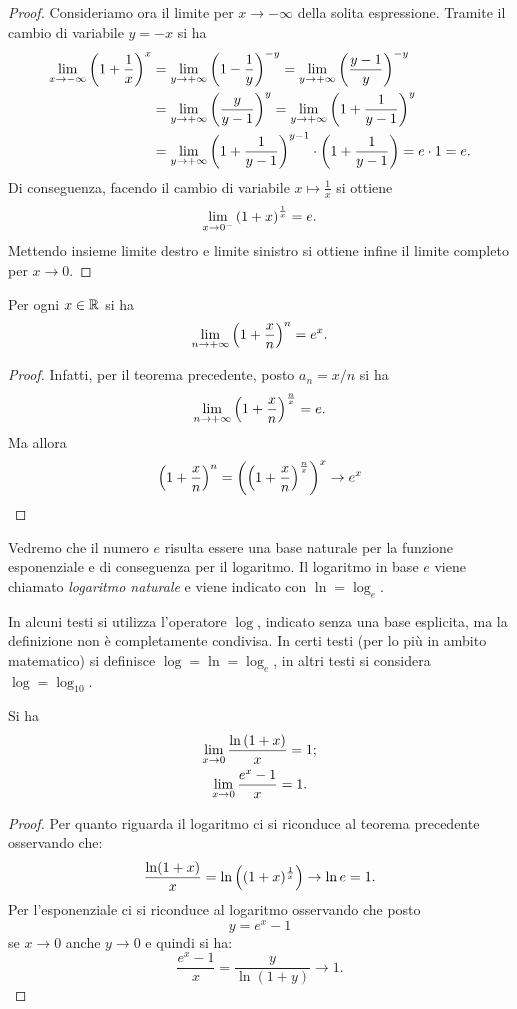 \begin{proof}
  Consideriamo ora il limite per $x\to -\infty$ 
  della solita espressione. 
  Tramite il cambio di variabile $y=-x$ si ha 
  \begin{align*}
  \lim_{x\to -\infty} {\left( 1+\frac{1}{x} \right)}^x 
  &= \lim_{y\to +\infty} {\left( 1 - \frac 1 y \right)}^{-y}
   = \lim_{y\to +\infty} {\left( \frac {y-1} y \right)}^{-y}\\
  &= \lim_{y\to +\infty} {\left( \frac{y}{y-1} \right)}^y
   = \lim_{y\to +\infty} {\left( 1 + \frac{1}{y-1} \right)}^y\\
  &= \lim_{y\to +\infty} {\left( 1 + \frac{1}{y-1} \right)}^{y-1}
    \cdot{\left( 1+\frac 1 {y-1} \right)} 
    = e\cdot 1 = e.\\
  \end{align*}
  Di conseguenza, facendo il cambio di variabile $x\mapsto \frac 1 x$ 
  si ottiene
  \[
  \lim_{x\to 0^-} {\left( 1+x \right)}^{\frac 1 x} = e.
  \]
  Mettendo insieme limite destro e limite sinistro si ottiene 
  infine il limite completo per $x\to 0$. 
\end{proof}
%
\begin{corollary}%
\label{cor:limite_notevole_ex}%
\mymark{**}%
Per ogni $x\in {\mathbb R}$ si ha
\[
  \lim_{n\to +\infty} {\left( 1+ \frac x n \right)}^n = e^x.
\]
\end{corollary}
%
\begin{proof}
Infatti, per il teorema precedente, posto $a_n = x/n$ si ha
\[
\lim_{n\to +\infty}{\left( 1+\frac x n \right)}^{\frac n x} = e.
\]
Ma allora
\[
{\left( 1+ \frac x n \right)}^n = {\left( {\left( 1+\frac x n \right)}^{\frac n x} \right)}^x
\to e^x
\]
\end{proof}

\begin{definition}
Vedremo che il numero $e$ risulta essere una base naturale per la funzione
esponenziale e di conseguenza per il logaritmo. Il logaritmo in base
$e$ viene chiamato \emph{logaritmo naturale}%
%
 e viene indicato con $\ln = \log_e$.
\end{definition}

In alcuni testi si utilizza l'operatore $\log$, indicato senza una base esplicita,
ma la definizione non è completamente condivisa.
In certi testi (per lo più in ambito matematico)
si definisce $\log  = \ln = \log_e$,
in altri testi si considera $\log = \log_{10}$.

\begin{corollary}\label{cor:limite_notevole_e}
\mymark{*}%
Si ha
\begin{gather}
 \lim_{x\to 0} \frac{\ln {\left( 1+ x \right)}}{x} = 1; \\
 \lim_{x\to 0} \frac{e^x-1}{x} = 1.
\end{gather}
\end{corollary}
%
\begin{proof}
Per quanto riguarda il logaritmo ci si riconduce al teorema precedente
osservando che:
\[
  \frac{\ln(1+x)}{x}
  = \ln {\left( (1+x)^{\frac 1 {x}} \right)}
  \to \ln e = 1.
\]
Per l'esponenziale ci si riconduce al logaritmo
osservando che posto
\[
  y = e^x-1
\]
se $x\to 0$ anche $y\to 0$ e quindi si ha:
\[
\frac{e^{x}-1}{x} = \frac{y}{\ln(1+y)} \to 1.
\]

\end{proof}

